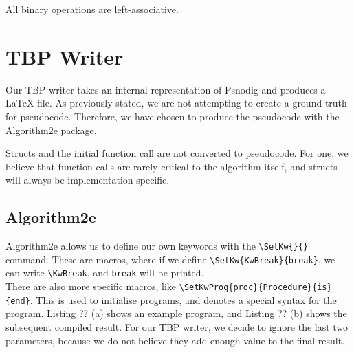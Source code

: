 All binary operations are left-associative.

\section{TBP Writer}

Our TBP writer takes an internal representation of Psnodig and produces a LaTeX file. As previously stated, we are not attempting to create a ground truth for pseudocode. Therefore, we have chosen to produce the pseudocode with the Algorithm2e package. \hfill \\


Structs and the initial function call are not converted to pseudocode. For one, we believe that function calls are rarely cruical to the algorithm itself, and structs will always be implementation specific. \hfill \\


\subsection{Algorithm2e}


Algorithm2e allows us to define our own keywords with the \texttt{\textbackslash SetKw\{\}\{\}} command. These are macros, where if we define \texttt{\textbackslash SetKw\{KwBreak\}\{break\}}, we can write \texttt{\textbackslash KwBreak}, and \texttt{break} will be printed. \hfill \\

There are also more specific macros, like \texttt{\textbackslash SetKwProg\{proc\}\{Procedure\}\{is\}\{end\}}. This is used to initialise programs, and denotes a special syntax for the program. Listing ?? (a) shows an example program, and Listing ?? (b) shows the subsequent compiled result. For our TBP writer, we decide to ignore the last two parameters, because we do not believe they add enough value to the final result. \hfill \\


